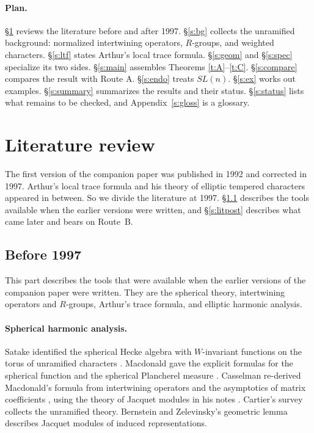 \documentclass[12pt,letterpaper]{article}
\numberwithin{equation}{section}
\theoremstyle{plain}
\theoremstyle{definition}
\theoremstyle{remark}
\begin{document}
\paragraph{Plan.} \S\ref{s:lit} reviews the literature before and after 1997. \S\ref{s:bg} collects the unramified background: normalized intertwining operators, $R$-groups, and weighted characters. \S\ref{s:ltf} states Arthur's local trace formula. \S\ref{s:geom} and \S\ref{s:spec} specialize its two sides. \S\ref{s:main} assembles Theorems \ref{t:A}--\ref{t:C}. \S\ref{s:compare} compares the result with Route A. \S\ref{s:endo} treats $SL(n)$. \S\ref{s:ex} works out examples. \S\ref{s:summary} summarizes the results and their status. \S\ref{s:status} lists what remains to be checked, and Appendix~\ref{s:gloss} is a glossary.

\section{Literature review}\label{s:lit}

The first version of the companion paper was published in 1992 \cite{Jo92} and corrected in 1997. Arthur's local trace formula and his theory of elliptic tempered characters appeared in between. So we divide the literature at 1997. \S\ref{s:litpre} describes the tools available when the earlier versions were written, and \S\ref{s:litpost} describes what came later and bears on Route~B.

\subsection{Before 1997}\label{s:litpre}

This part describes the tools that were available when the earlier versions of the companion paper were written. They are the spherical theory, intertwining operators and $R$-groups, Arthur's trace formula, and elliptic harmonic analysis.

\paragraph{Spherical harmonic analysis.} Satake identified the spherical Hecke algebra with $W$-invariant functions on the torus of unramified characters \cite{Sa63}. Macdonald gave the explicit formulas for the spherical function and the spherical Plancherel measure \cite{Ma71}. Casselman re-derived Macdonald's formula from intertwining operators and the asymptotics of matrix coefficients \cite{Ca80}, using the theory of Jacquet modules in his notes \cite{Ca95}. Cartier's survey \cite{Ca79} collects the unramified theory. Bernstein and Zelevinsky's geometric lemma \cite{BZ77} describes Jacquet modules of induced representations.
\end{document}
